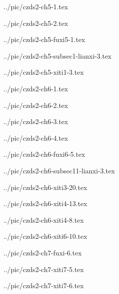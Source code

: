 

../pic/czds2-ch5-1.tex



../pic/czds2-ch5-2.tex



../pic/czds2-ch5-fuxi5-1.tex



../pic/czds2-ch5-subsec1-lianxi-3.tex



../pic/czds2-ch5-xiti1-3.tex



../pic/czds2-ch6-1.tex



../pic/czds2-ch6-2.tex



../pic/czds2-ch6-3.tex



../pic/czds2-ch6-4.tex



../pic/czds2-ch6-fuxi6-5.tex



../pic/czds2-ch6-subsec11-lianxi-3.tex



../pic/czds2-ch6-xiti3-20.tex



../pic/czds2-ch6-xiti4-13.tex



../pic/czds2-ch6-xiti4-8.tex



../pic/czds2-ch6-xiti6-10.tex



../pic/czds2-ch7-fuxi-6.tex



../pic/czds2-ch7-xiti7-5.tex



../pic/czds2-ch7-xiti7-6.tex

